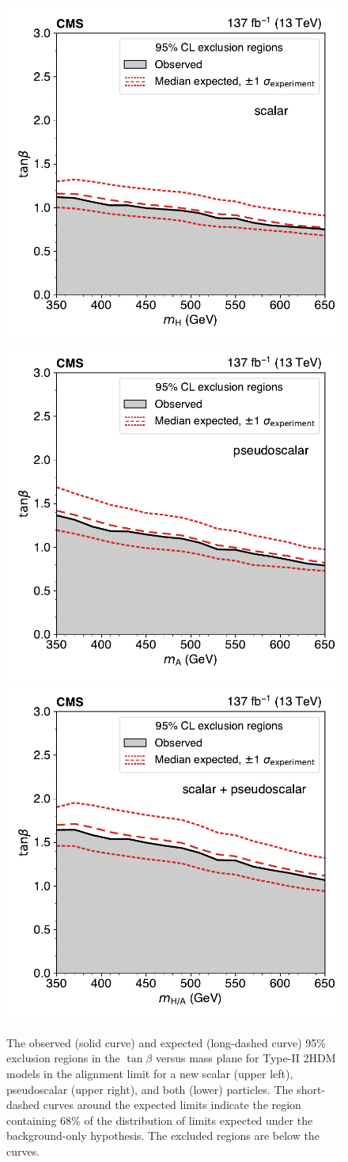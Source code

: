 \begin{figure}[!hbtp]
\centering
    \includegraphics[width=.49\textwidth]{figs/ftp/plot_2d_2hdm_tanbetaexclusion_h.pdf}
    \includegraphics[width=.49\textwidth]{figs/ftp/plot_2d_2hdm_tanbetaexclusion_a.pdf}
    \includegraphics[width=.49\textwidth]{figs/ftp/plot_2d_2hdm_tanbetaexclusion_b.pdf}
\caption{
    The observed (solid curve) and expected (long-dashed curve) 95\% \CL exclusion regions in the $\tan\beta$ versus mass plane
    for Type-II 2HDM models in the alignment limit for a new scalar \PH (upper left), pseudoscalar \PSA (upper right), and both (lower) particles.
    The short-dashed curves around the expected limits indicate the region containing 68\% of the distribution of limits expected under the
    background-only hypothesis. The excluded regions are below the curves.
}
\label{fig:HiggsLimitsTB}
\end{figure}

